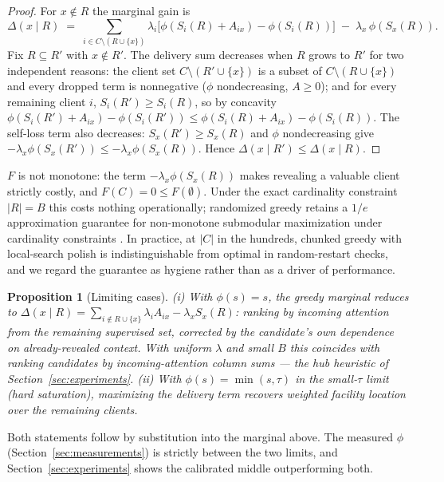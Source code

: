 \documentclass{article} %
\newtheorem{proposition}{Proposition}
\begin{document}
\begin{proof}
For $x \notin R$ the marginal gain is
\[
\Delta(x \mid R) \;=\; \sum_{i \in C \setminus (R \cup \{x\})} \lambda_i \big[\phi(S_i(R) + A_{ix}) - \phi(S_i(R))\big] \;-\; \lambda_x\, \phi(S_x(R)).
\]
Fix $R \subseteq R'$ with $x \notin R'$. The delivery sum decreases when $R$ grows to $R'$ for two independent reasons: the client set $C \setminus (R' \cup \{x\})$ is a subset of $C \setminus (R \cup \{x\})$ and every dropped term is nonnegative ($\phi$ nondecreasing, $A \geq 0$); and for every remaining client $i$, $S_i(R') \geq S_i(R)$, so by concavity $\phi(S_i(R') + A_{ix}) - \phi(S_i(R')) \leq \phi(S_i(R) + A_{ix}) - \phi(S_i(R))$. The self-loss term also decreases: $S_x(R') \geq S_x(R)$ and $\phi$ nondecreasing give $-\lambda_x \phi(S_x(R')) \leq -\lambda_x \phi(S_x(R))$. Hence $\Delta(x \mid R') \leq \Delta(x \mid R)$.
\end{proof}

$F$ is not monotone: the term $-\lambda_x \phi(S_x(R))$ makes revealing a valuable client strictly costly, and $F(C) = 0 \leq F(\emptyset)$. Under the exact cardinality constraint $|R| = B$ this costs nothing operationally; randomized greedy retains a $1/e$ approximation guarantee for non-monotone submodular maximization under cardinality constraints \citep{buchbinder2014submodular}. In practice, at $|C|$ in the hundreds, chunked greedy with local-search polish is indistinguishable from optimal in random-restart checks, and we regard the guarantee as hygiene rather than as a driver of performance.

\begin{proposition}[Limiting cases]
\label{prop:limits}
(i) With $\phi(s) = s$, the greedy marginal reduces to
$\Delta(x \mid R) = \sum_{i \notin R \cup \{x\}} \lambda_i A_{ix} - \lambda_x S_x(R)$:
ranking by incoming attention from the remaining supervised set, corrected by the candidate's own dependence on already-revealed context. With uniform $\lambda$ and small $B$ this coincides with ranking candidates by incoming-attention column sums --- the hub heuristic of Section~\ref{sec:experiments}. (ii) With $\phi(s) = \min(s, \tau)$ in the small-$\tau$ limit (hard saturation), maximizing the delivery term recovers weighted facility location over the remaining clients.
\end{proposition}

Both statements follow by substitution into the marginal above. The measured $\phi$ (Section~\ref{sec:measurements}) is strictly between the two limits, and Section~\ref{sec:experiments} shows the calibrated middle outperforming both.
\end{document}
